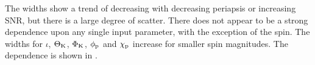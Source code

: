 The widths show a trend of decreasing with decreasing periapsis or increasing SNR, but there is a large degree of scatter. There does not appear to be a strong dependence upon any single input parameter, with the exception of the spin. The widths for $\iota$, $\Theta_\mathrm{K}$, $\Phi_\mathrm{K}$, $\phi_\mathrm{p}$ and $\chi_\mathrm{p}$ increase for smaller spin magnitudes. The dependence is shown in .
\begin{figure}[!htp]
\begin{center}
 \quad
{} \\
 \quad
{} \\

\end{center}
\end{figure}
